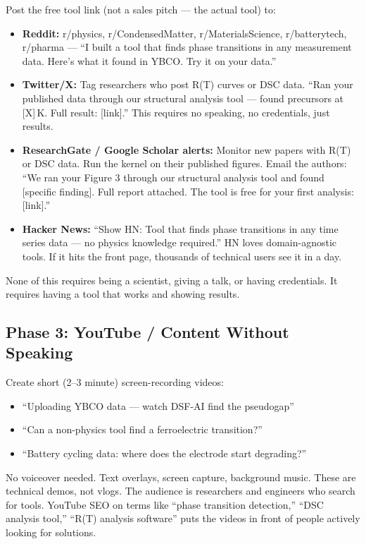 \documentclass[11pt,letterpaper]{article}
\begin{document}
Post the free tool link (not a sales pitch --- the actual tool) to:
\begin{itemize}
  \item \textbf{Reddit:} r/physics, r/CondensedMatter, r/MaterialsScience,
    r/batterytech, r/pharma --- ``I built a tool that finds phase
    transitions in any measurement data. Here's what it found in YBCO.
    Try it on your data.''
  \item \textbf{Twitter/X:} Tag researchers who post R(T) curves or
    DSC data. ``Ran your published data through our structural
    analysis tool --- found precursors at [X]\,K. Full result:
    [link].'' This requires no speaking, no credentials, just results.
  \item \textbf{ResearchGate / Google Scholar alerts:} Monitor new
    papers with R(T) or DSC data. Run the kernel on their published
    figures. Email the authors: ``We ran your Figure 3 through our
    structural analysis tool and found [specific finding]. Full report
    attached. The tool is free for your first analysis: [link].''
  \item \textbf{Hacker News:} ``Show HN: Tool that finds phase
    transitions in any time series data --- no physics knowledge
    required.'' HN loves domain-agnostic tools. If it hits the front
    page, thousands of technical users see it in a day.
\end{itemize}

None of this requires being a scientist, giving a talk, or having
credentials. It requires having a tool that works and showing results.

\subsection{Phase 3: YouTube / Content Without Speaking}

Create short (2--3 minute) screen-recording videos:
\begin{itemize}
  \item ``Uploading YBCO data --- watch DSF-AI find the pseudogap''
  \item ``Can a non-physics tool find a ferroelectric transition?''
  \item ``Battery cycling data: where does the electrode start
    degrading?''
\end{itemize}

No voiceover needed. Text overlays, screen capture, background music.
These are technical demos, not vlogs. The audience is researchers
and engineers who search for tools. YouTube SEO on terms like
``phase transition detection,'' ``DSC analysis tool,''
``R(T) analysis software'' puts the videos in front of people
actively looking for solutions.
\end{document}
